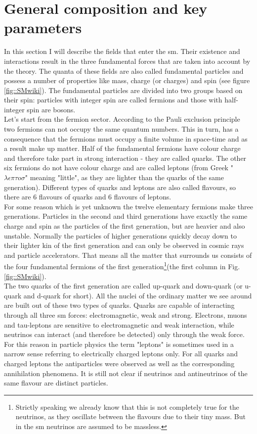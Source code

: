  \section{General composition and key parameters}
 \label{sec::sm_gen}
	In this section I will describe the fields that enter the \gls{sm}. Their existence and interactions result in the three fundamental forces that are taken into account by the theory. The quanta of these fields are also called fundamental particles and possess a number of properties like mass, charge (or charges) and spin (see figure \ref{fig::SMwiki}). The fundamental particles are divided into two groups based on their spin: particles with integer spin are called fermions and those with half-integer spin are bosons. \\
	Let's start from the fermion sector. According to the Pauli exclusion principle\cite{pep} two fermions can not occupy the same quantum numbers. This in turn, has a consequence that the fermions must occupy a finite volume in space-time and as a result make up matter. Half of the fundamental fermions have colour charge and therefore take part in strong interaction - they are called quarks. The other six fermions do not have colour charge and are called leptons (from Greek "$\lambda \epsilon \pi \tau o \sigma$" meaning "little", as they are lighter than the quarks of the same generation). Different types of quarks and leptons are also called flavours, so there are 6 flavours of quarks and 6 flavours of leptons.\\
	For some reason which is yet unknown the twelve elementary fermions make three generations. Particles in the second and third generations have exactly the same charge and spin as the particles of the first generation, but are heavier and also unstable.  Normally the particles of higher generations quickly decay down to their lighter kin of the first generation and can only be observed in cosmic rays and particle accelerators. That means all the matter that surrounds us consists of the four fundamental fermions of the first generation\footnote{Strictly speaking we already know that this is not completely true for the neutrinos, as they oscillate between the flavours due to their tiny mass. But in the \gls{sm} neutrinos are assumed to be massless.}(the first column in Fig. \ref{fig::SMwiki}).\\
	The two quarks of the first generation are called up-quark and down-quark (or u-quark and d-quark for short). All the nuclei of the ordinary matter we see around are built out of these two types of quarks. Quarks are capable of interacting through all three \gls{sm} forces: electromagnetic, weak and strong. Electrons, muons and tau-leptons are sensitive to electromagnetic and weak interaction, while neutrinos can interact (and therefore be detected) only through the weak force. For this reason in particle physics the term "leptons" is sometimes used in a narrow sense referring to electrically charged leptons only. For all quarks and charged leptons the antiparticles were observed as well as the corresponding annihilation phenomena. It is still not clear if neutrinos and antineutrinos of the same flavour are distinct particles.\\

